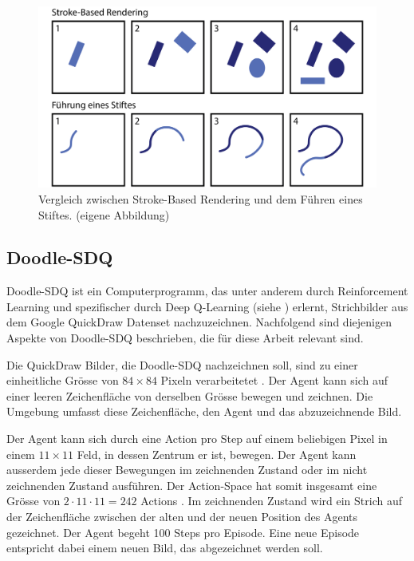 \begin{figure}[!ht]
   \centering
   \includegraphics[width=\textwidth-2cm]{images/theorie/stroke-v-stift.png}
   \caption{Vergleich zwischen Stroke-Based Rendering und dem Führen eines Stiftes. (eigene Abbildung)}\label{fig:stroke-v-stift}
\end{figure}
 
\subsection{Doodle-SDQ}\label{sub:t_ver_dood} Doodle-SDQ ist ein
Computerprogramm, das unter anderem durch Reinforcement Learning und
spezifischer durch Deep Q-Learning (siehe ) erlernt,
Strichbilder aus dem Google QuickDraw Datenset \cite{noauthor_quick_2022}
nachzuzeichnen. Nachfolgend sind diejenigen Aspekte von Doodle-SDQ beschrieben,
die für diese Arbeit relevant sind.
 
Die QuickDraw Bilder, die Doodle-SDQ nachzeichnen soll, sind zu einer
einheitliche Grösse von $84\times84$ Pixeln verarbeitetet \cite[S.
7]{zhou_learning_2018}. Der Agent kann sich auf einer leeren Zeichenfläche von
derselben Grösse bewegen und zeichnen. Die Umgebung umfasst diese
Zeichenfläche, den Agent und das abzuzeichnende Bild.
 
Der Agent kann sich durch eine Action pro Step auf einem beliebigen Pixel in
einem $11\times11$ Feld, in dessen Zentrum er ist, bewegen. Der Agent kann
ausserdem jede dieser Bewegungen im zeichnenden Zustand oder im nicht
zeichnenden Zustand ausführen. Der Action-Space hat somit insgesamt eine Grösse
von $2\cdot11\cdot11 = 242$ Actions \cite[S. 5]{zhou_learning_2018}. Im
zeichnenden Zustand wird ein Strich auf der Zeichenfläche zwischen der alten und
der neuen Position des Agents gezeichnet. Der Agent begeht 100 Steps pro
Episode. Eine neue Episode entspricht dabei einem neuen Bild, das abgezeichnet
werden soll.
 
